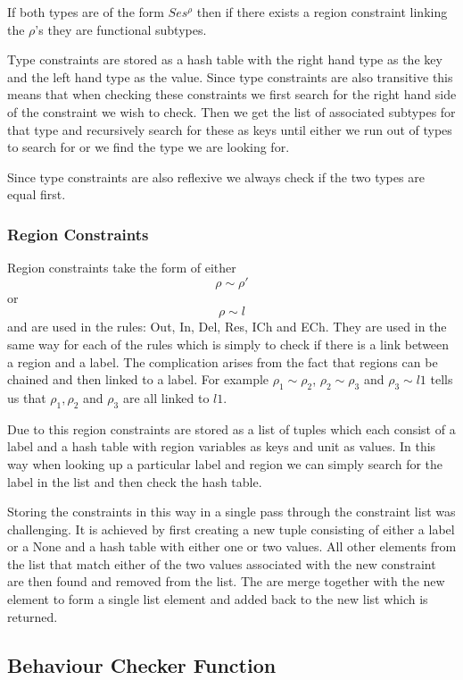 If both types are of the form $Ses^{\rho}$ then if there exists a region constraint linking the $\rho$'s  they are functional subtypes.

Type constraints are stored as a hash table with the right hand type as the key and the left hand type as the value. Since type constraints are also transitive this means that when checking these constraints we first search for the right hand side of the constraint we wish to check. Then we get the list of associated subtypes for that type and recursively search for these as keys until either we run out of types to search for or we find the type we are looking for. 

Since type constraints are also reflexive we always check if the two types are equal first.

\subsubsection{Region Constraints}

Region constraints take the form of either $$\rho \sim \rho'$$ or $$\rho \sim l$$ and are used in the rules: Out, In, Del, Res, ICh and ECh. They are used in the same way for each of the rules which is simply to check if there is a link between a region and a label. The complication arises from the fact that regions can be chained and then linked to a label. For example $\rho_1 \sim \rho_2$, $\rho_2 \sim \rho_3$ and $\rho_3 \sim l1$ tells us that $\rho_1,\rho_2$ and $\rho_3$ are all linked to $l1$.

Due to this region constraints are stored as a list of tuples which each consist of a label and a hash table with region variables as keys and unit as values. In this way when looking up a particular label and region we can simply search for the label in the list and then check the hash table. 

Storing the constraints in this way in a single pass through the constraint list was challenging. It is achieved by first creating a new tuple consisting of either a label or a None and a hash table with either one or two values. All other elements from the list that match either of the two values associated with the new constraint are then found and removed from the list. The are merge together with the new element to form a single list element and added back to the new list which is returned. 

\subsection{Behaviour Checker Function}

